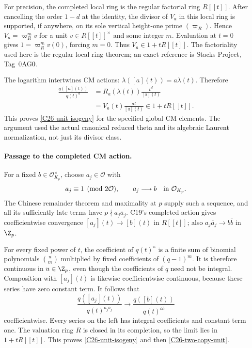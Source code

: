 For precision, the completed local ring is the regular factorial
ring $R[[t]]$.  After cancelling the order $1-d$ at the identity,
the divisor of $V_a$ in this local ring is supported, if anywhere,
on its sole vertical height-one prime $(\varpi_R)$.
Hence $V_a=\varpi_R^m v$ for a unit
$v\in R[[t]]^{\times}$ and some integer $m$.
Evaluation at $t=0$ gives $1=\varpi_R^m v(0)$, forcing $m=0$.
Thus $V_a\in1+tR[[t]]$.
The factoriality used here is the regular-local-ring theorem;
an exact reference is Stacks Project, Tag~0AG0.

The logarithm intertwines CM actions:
$\lambda([a](t))=a\lambda(t)$.  Therefore
\begin{align*}
 \frac{q([a](t))}{q(t)^d}
 &=R_a(\lambda(t))\frac{t^d}{[a](t)}\\
 &=V_a(t)\frac{a t}{[a](t)}\in1+tR[[t]].
\end{align*}
This proves \eqref{C26-unit-isogeny} for the specified global
CM elements.  The argument used the actual canonical reduced
theta and its algebraic Laurent normalization, not just its
divisor class.

\paragraph{Passage to the completed CM action.}
For a fixed $b\in\mathcal O_{K_p}^{\times}$, choose
$a_j\in\mathcal O$ with
\[
 a_j\equiv1\pmod{2\mathcal O},\qquad
 a_j\longrightarrow b\quad\hbox{in }\mathcal O_{K_p}.
\]
The Chinese remainder theorem and maximality at $p$ supply
such a sequence, and all its sufficiently late terms have
$p\nmid a_j\bar a_j$.  C19's completed action gives
coefficientwise convergence $[a_j](t)\to[b](t)$ in $R[[t]]$;
also $a_j\bar a_j\to b\bar b$ in $\Z_p$.

For every fixed power of $t$, the coefficient of $q(t)^u$
is a finite sum of binomial polynomials $\binom{u}{m}$
multiplied by fixed coefficients of $(q-1)^m$.
It is therefore continuous in $u\in\Z_p$, even though the
coefficients of $q$ need not be integral.
Composition with $[a_j](t)$ is likewise coefficientwise
continuous, because these series have zero constant term.
It follows that
\[
 \frac{q([a_j](t))}{q(t)^{a_j\bar a_j}}
          \longrightarrow
 \frac{q([b](t))}{q(t)^{b\bar b}}
\]
coefficientwise.  Every series on the left has integral
coefficients and constant term one.  The valuation ring $R$
is closed in its completion, so the limit lies in
$1+tR[[t]]$.  This proves \eqref{C26-unit-isogeny} and
then \eqref{C26-two-copy-unit}.

